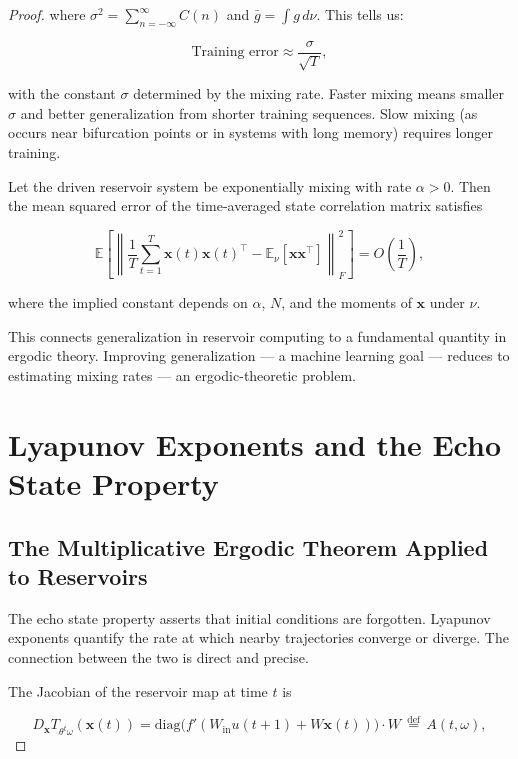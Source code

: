 \begin{proof}
where $\sigma^2 = \sum_{n=-\infty}^{\infty} C(n)$ and $\bar{g} = \int g \, d\nu$. This tells us:

\[
\text{Training error} \approx \frac{\sigma}{\sqrt{T}},
\]

with the constant $\sigma$ determined by the mixing rate. Faster mixing means smaller $\sigma$ and better generalization from shorter training sequences. Slow mixing (as occurs near bifurcation points or in systems with long memory) requires longer training.

\begin{proposition}\label{prop:16.3.}
Let the driven reservoir system be exponentially mixing with rate $\alpha > 0$. Then the mean squared error of the time-averaged state correlation matrix satisfies

\[
\mathbb{E}\left[\left\| \frac{1}{T} \sum_{t=1}^T \mathbf{x}(t)\mathbf{x}(t)^\top - \mathbb{E}_\nu[\mathbf{x}\mathbf{x}^\top] \right\|_F^2\right] = O\!\left(\frac{1}{T}\right),
\]

where the implied constant depends on $\alpha$, $N$, and the moments of $\mathbf{x}$ under $\nu$.

This connects generalization in reservoir computing to a fundamental quantity in ergodic theory. Improving generalization --- a machine learning goal --- reduces to estimating mixing rates --- an ergodic-theoretic problem.


\bigskip

\end{proposition}


\section{Lyapunov Exponents and the Echo State Property}\label{sec:16.3}

\subsection{The Multiplicative Ergodic Theorem Applied to Reservoirs}\label{sec:16.3.1}

The echo state property asserts that initial conditions are forgotten. Lyapunov exponents quantify the rate at which nearby trajectories converge or diverge. The connection between the two is direct and precise.

The Jacobian of the reservoir map at time $t$ is

\[
D_\mathbf{x} T_{\theta^t \omega}(\mathbf{x}(t)) = \text{diag}\bigl(f'(W_{\text{in}} u(t+1) + W \mathbf{x}(t))\bigr) \cdot W \,\stackrel{\text{def}}{=}\, A(t, \omega),
\]


\end{proof}
